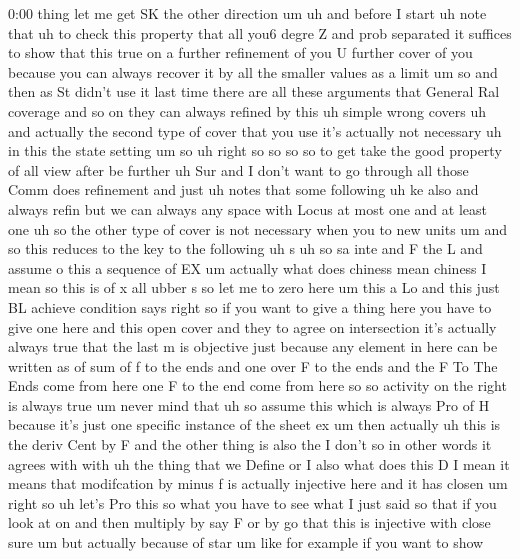\begin{unfinished}{0:00}
thing  let  me  get  SK  the  other  direction
um  uh  and  before  I  start  uh  note  that  uh
to  check  this  property  that  all  you6
degre  Z  and  prob  separated  it  suffices
to  show  that  this  true  on  a  further
refinement  of  you  U  further  cover  of  you
because  you  can  always  recover  it  by  all
the  smaller  values  as  a  limit  um
so  and  then  as  St  didn't  use  it  last
time  there  are  all  these  arguments  that
General  Ral  coverage  and  so  on  they  can
always  refined  by  this  uh  simple  wrong
covers  uh  and  actually  the  second  type
of  cover  that  you  use  it's  actually  not
necessary  uh  in  this  the  state  setting
um
so
uh  right  so  so  so
so
to  get  take  the  good
property  of  all
view  after  be
further  uh
Sur  and  I  don't  want  to  go  through  all
those  Comm  does  refinement  and  just  uh
notes  that  some  following  uh
ke
also  and  always  refin
but
we  can  always  any  space  with
Locus  at  most  one  and  at  least
one  uh  so  the  other  type  of  cover  is  not
necessary  when  you  to  new  units  um  and
so  this  reduces  to  the  key  to  the
following  uh
s
uh  so  sa
inte  and  F  the
L  and
assume
o
this  a  sequence  of
EX  um  actually  what  does  chiness  mean
chiness  I  mean  so  this  is  of
x  all
ubber
s  so  let  me  to  zero  here
um  this  a
Lo  and  this  just  BL  achieve  condition
says  right  so  if  you  want  to  give  a
thing  here  you  have  to  give  one  here  and
this  open  cover  and  they  to  agree  on
intersection  it's  actually  always  true
that  the  last  m  is  objective  just
because  any  element  in  here  can  be
written  as  of  sum  of  f  to  the  ends  and
one  over  F  to  the  ends  and  the  F  To  The
Ends  come  from  here  one  F  to  the  end
come  from  here  so  so  activity  on  the
right  is  always  true
um  never  mind  that  uh  so  assume  this
which
is  always  Pro  of
H  because  it's  just  one  specific
instance  of  the  sheet  ex
um  then  actually
uh
this
is  the  deriv  Cent
by  F  and  the  other  thing  is  also
the  I
don't  so  in  other  words  it  agrees  with
with  uh  the  thing  that  we
Define  or  I  also  what  does  this  D  I  mean
it  means  that  modifcation  by  minus  f  is
actually  injective  here  and  it  has
closen
um  right
so  uh  let's  Pro  this  so  what  you  have  to
see  what  I  just  said  so  that  if  you  look
at
on  and  then  multiply  by  say
F  or
by
go  that  this  is  injective  with
close
sure
um  but  actually  because  of  star  um  like
for  example  if  you  want  to  show

\end{unfinished}
